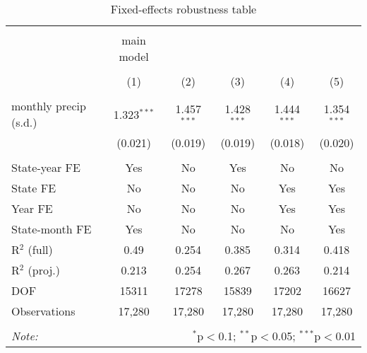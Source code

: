 
\begin{table}[!htbp] \centering 
  \caption{Fixed-effects robustness table} 
  \label{} 
\scriptsize 
\begin{tabular}{@{\extracolsep{2pt}}lccccc} 
\\[-1.8ex]\hline 
\hline \\[-1.8ex] 
 & main model &  &  &  &  \\ 
\\[-1.8ex] & (1) & (2) & (3) & (4) & (5)\\ 
\hline \\[-1.8ex] 
 monthly precip (s.d.) & 1.323$^{***}$ & 1.457$^{***}$ & 1.428$^{***}$ & 1.444$^{***}$ & 1.354$^{***}$ \\ 
  & (0.021) & (0.019) & (0.019) & (0.018) & (0.020) \\ 
 \hline \\[-1.8ex] 
State-year FE & Yes & No & Yes & No & No \\ 
State FE & No & No & No & Yes & Yes \\ 
Year FE & No & No & No & Yes & Yes \\ 
State-month FE & Yes & No & No & No & Yes \\ 
R$^2$ (full) & 0.49 & 0.254 & 0.385 & 0.314 & 0.418 \\ 
R$^2$ (proj.) & 0.213 & 0.254 & 0.267 & 0.263 & 0.214 \\ 
DOF & 15311 & 17278 & 15839 & 17202 & 16627 \\ 
Observations & 17,280 & 17,280 & 17,280 & 17,280 & 17,280 \\ 
\hline 
\hline \\[-1.8ex] 
\textit{Note:}  & \multicolumn{5}{r}{$^{*}$p$<$0.1; $^{**}$p$<$0.05; $^{***}$p$<$0.01} \\ 
\end{tabular} 
\end{table} 
